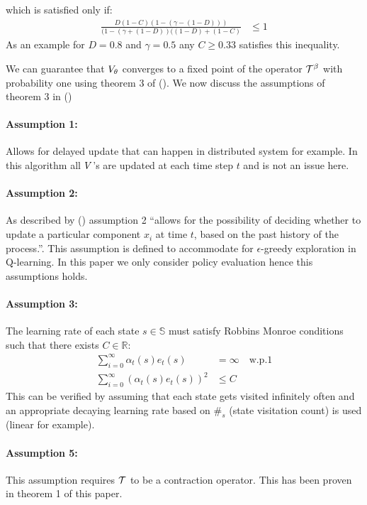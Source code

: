 which is satisfied only if:
\begin{equation}
\begin{split}
    \frac{D(1-C)(1-(\gamma-(1-D)))}{(1-(\gamma + (1-D))((1-D)+(1-C)} &\leq 1
\end{split}
\end{equation}
As an example for $D = 0.8$ and $\gamma = 0.5$ any $C\geq 0.33$ satisfies this inequality.

We can guarantee that $V_{\theta}$ converges to a fixed point of the operator $\mathcal{T}^{\beta}$ with probability one using theorem 3 of (\cite{tsitsiklis1994asynchronous}). 
We now discuss the assumptions of theorem 3 in (\cite{tsitsiklis1994asynchronous}) 
\paragraph{Assumption 1:} Allows for delayed update that can happen in distributed system for example. In this algorithm all $V$'s are updated at each time step $t$ and is not an issue here.
\paragraph{Assumption 2: } As described by (\cite{tsitsiklis1994asynchronous}) assumption 2 ``allows for the possibility of deciding whether to update a particular component $x_i$ at time $t$, based on the past history of the process.''. This assumption is defined to accommodate for $\epsilon$-greedy exploration in Q-learning. In this paper we only consider policy evaluation hence this assumptions holds.
\paragraph{ Assumption 3:} The learning rate of each state $s \in \mathbb{S}$ must satisfy Robbins Monroe conditions such that there exists $C \in \mathbb{R}$:
\begin{equation}
    \begin{split}
        \sum_{i=0}^{\infty} \alpha_t(s) 
e_t(s) &= \infty \quad \text{w.p.1}\\
        \sum_{i=0}^{\infty} (\alpha_t(s) e_t(s))^2 &\leq C      \end{split}
\end{equation}
This can be verified by assuming that each state gets visited infinitely often and an appropriate decaying learning rate based on $\#_s$ (state visitation count) is used (linear for example). 
\paragraph{Assumption 5:} This assumption requires $\mathcal{T}$ to be a contraction operator. This has been proven in theorem 1 of this paper.

